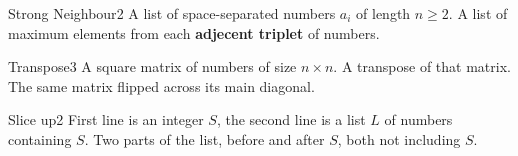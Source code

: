 \begin{task}{Strong Neighbour}{2}
    \In
    A list of space-separated numbers $a_i$ of length $n \geq 2$.
    \Out
    A list of maximum elements from each \textbf{adjecent triplet} of numbers.

    \begin{ExampleIO}
    \end{ExampleIO}
\end{task}

\begin{task}{Transpose}{3}
    \In
    A square matrix of numbers of size $n \times n$.
    \Out
    A transpose of that matrix. The same matrix flipped across its main diagonal.

    \begin{ExampleIO}
    \end{ExampleIO}
\end{task}

\begin{task}{Slice up}{2}
    \In
    First line is an integer $S$, the second line is a list $L$ of numbers containing $S$.
    \Out
    Two parts of the list, before and after $S$, both not including $S$.
    \begin{ExampleIO}
    \end{ExampleIO}
\end{task}

